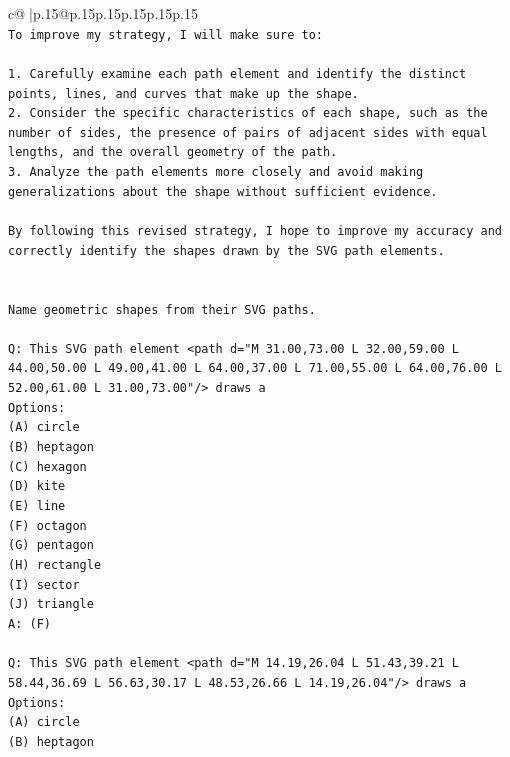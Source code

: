 \documentclass{article}
\begin{document}
{\begin{supertabular}{c@{$\;$}|p{.15\linewidth}@{}p{.15\linewidth}p{.15\linewidth}p{.15\linewidth}p{.15\linewidth}p{.15\linewidth}}
{{{\\ 
\texttt{To improve my strategy, I will make sure to:} \\
\\ 
\texttt{1. Carefully examine each path element and identify the distinct points, lines, and curves that make up the shape.} \\
\texttt{2. Consider the specific characteristics of each shape, such as the number of sides, the presence of pairs of adjacent sides with equal lengths, and the overall geometry of the path.} \\
\texttt{3. Analyze the path elements more closely and avoid making generalizations about the shape without sufficient evidence.} \\
\\ 
\texttt{By following this revised strategy, I hope to improve my accuracy and correctly identify the shapes drawn by the SVG path elements.} \\
\\ 
\\ 
\texttt{Name geometric shapes from their SVG paths.} \\
\\ 
\texttt{Q: This SVG path element <path d="M 31.00,73.00 L 32.00,59.00 L 44.00,50.00 L 49.00,41.00 L 64.00,37.00 L 71.00,55.00 L 64.00,76.00 L 52.00,61.00 L 31.00,73.00"/> draws a} \\
\texttt{Options:} \\
\texttt{(A) circle} \\
\texttt{(B) heptagon} \\
\texttt{(C) hexagon} \\
\texttt{(D) kite} \\
\texttt{(E) line} \\
\texttt{(F) octagon} \\
\texttt{(G) pentagon} \\
\texttt{(H) rectangle} \\
\texttt{(I) sector} \\
\texttt{(J) triangle} \\
\texttt{A: (F)} \\
\\ 
\texttt{Q: This SVG path element <path d="M 14.19,26.04 L 51.43,39.21 L 58.44,36.69 L 56.63,30.17 L 48.53,26.66 L 14.19,26.04"/> draws a} \\
\texttt{Options:} \\
\texttt{(A) circle} \\
\texttt{(B) heptagon} \\
}}}
\end{supertabular}}
\end{document}
